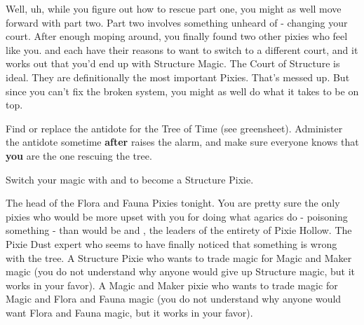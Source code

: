 \documentclass[char]{PP}
\begin{document}
Well, uh, while you figure out how to rescue part one, you might as well move forward with part two. Part two involves something unheard of - changing your court. After enough moping around, you finally found two other pixies who feel like you. \cSAdvisor{} and \cSChange{} each have their reasons to want to switch to a different court, and it works out that you’d end up with Structure Magic. The Court of Structure is ideal. They are definitionally the most important Pixies. That’s messed up. But since you can’t fix the broken system, you might as well do what it takes to be on top.

\begin{itemz}
	\item Find or replace the antidote for the Tree of Time (see greensheet). Administer the antidote sometime \textbf{after} \cMTree{} raises the alarm, and make sure everyone knows that \textbf{you} are the one rescuing the tree.
	\item Switch your magic with \cSAdvisor{} and \cMChange{} to become a Structure Pixie.
\end{itemz}

\begin{itemz}[Notes]
	\item 
\end{itemz}

\begin{contacts}
	\contact{\cFHead{}} The head of the Flora and Fauna Pixies tonight. You are pretty sure the only pixies who would be more upset with you for doing what agarics do - poisoning something - than \cFHead{} would be \cSHead{} and \cSAdvisor{}, the leaders of the entirety of Pixie Hollow.
	\contact{\cMTree{}} The Pixie Dust expert who seems to have finally noticed that something is wrong with the tree.
	\contact{\cSAdvisor{}} A Structure Pixie who wants to trade \cSAdvisor{\their} magic for Magic and Maker magic (you do not understand why anyone would give up Structure magic, but it works in your favor).
	\contact{\cSChange{}} A Magic and Maker pixie who wants to trade \cSAdvisor{\their} magic for Magic and Flora and Fauna magic (you do not understand why anyone would want Flora and Fauna magic, but it works in your favor).
\end{contacts}
\end{document}

